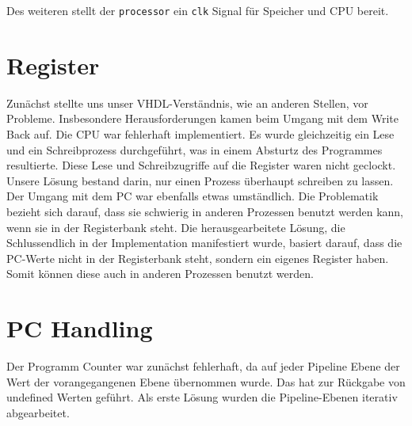 \documentclass[paper=a4,fontsize=12pt,twocolumn]{scrreprt}
\begin{document}
Des weiteren stellt der \texttt{processor} ein \texttt{clk} Signal für Speicher und CPU bereit.

\section{Register}






Zunächst stellte uns unser VHDL-Verständnis, wie an anderen Stellen, vor Probleme.
Insbesondere Herausforderungen kamen beim Umgang mit dem Write Back auf. Die CPU war fehlerhaft implementiert. Es wurde gleichzeitig ein Lese und ein Schreibprozess durchgeführt, was in einem Absturtz des Programmes resultierte. Diese Lese und Schreibzugriffe auf die Register waren nicht geclockt. Unsere Lösung bestand darin, nur einen Prozess überhaupt schreiben zu lassen. Der Umgang mit dem PC war ebenfalls etwas umständlich.
Die Problematik bezieht sich darauf, dass sie schwierig in anderen Prozessen benutzt werden kann, wenn sie in der Registerbank steht.
Die herausgearbeitete Lösung, die Schlussendlich in der Implementation manifestiert wurde, basiert darauf, dass die PC-Werte nicht in der Registerbank steht, sondern ein eigenes Register haben.
Somit können diese auch in anderen Prozessen benutzt werden.


\section{PC Handling}

Der Programm Counter war zunächst fehlerhaft, da auf jeder Pipeline Ebene der Wert der vorangegangenen Ebene übernommen wurde. Das hat zur Rückgabe 
von undefined Werten geführt. Als erste Lösung wurden die Pipeline-Ebenen iterativ abgearbeitet. 
\end{document}
